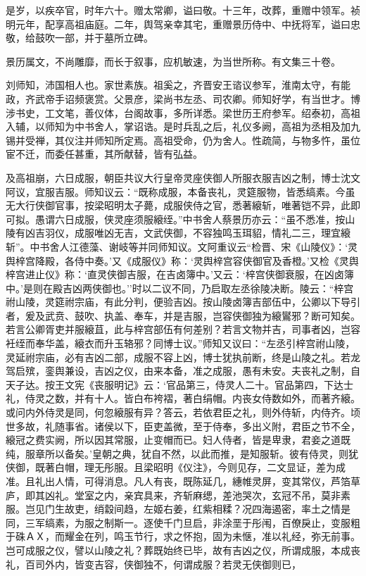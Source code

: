 \documentclass[]{article}
\begin{document}
是岁，以疾卒官，时年六十。赠太常卿，谥曰敬。十三年，改葬，重赠中领军。祯明元年，配享高祖庙庭。二年，舆驾亲幸其宅，重赠景历侍中、中抚将军，谥曰忠敬，给鼓吹一部，并于墓所立碑。

景历属文，不尚雕靡，而长于叙事，应机敏速，为当世所称。有文集三十卷。

刘师知，沛国相人也。家世素族。祖奚之，齐晋安王谘议参军，淮南太守，有能政，齐武帝手诏频褒赏。父景彦，梁尚书左丞、司农卿。师知好学，有当世才。博涉书史，工文笔，善仪体，台阁故事，多所详悉。梁世历王府参军。绍泰初，高祖入辅，以师知为中书舍人，掌诏诰。是时兵乱之后，礼仪多阙，高祖为丞相及加九锡并受禅，其仪注并师知所定焉。高祖受命，仍为舍人。性疏简，与物多忤，虽位宦不迁，而委任甚重，其所献替，皆有弘益。

及高祖崩，六日成服，朝臣共议大行皇帝灵座侠御人所服衣服吉凶之制，博士沈文阿议，宜服吉服。师知议云：``既称成服，本备丧礼，灵筵服物，皆悉缟素。今虽无大行侠御官事，按梁昭明太子薨，成服侠侍之官，悉著縗斩，唯著铠不异，此即可拟。愚谓六日成服，侠灵座须服縗绖。''中书舍人蔡景历亦云：``虽不悉准，按山陵有凶吉羽仪，成服唯凶无吉，文武侠御，不容独鸣玉珥貂，情礼二三，理宜縗斩''。中书舍人江德藻、谢岐等并同师知议。文阿重议云``检晋、宋《山陵仪》：`灵舆梓宫降殿，各侍中奏。'又《成服仪》称：`灵舆梓宫容侠御官及香橙。'又检《灵舆梓宫进止仪》称：`直灵侠御吉服，在吉卤簿中。'又云：`梓宫侠御衰服，在凶卤簿中。'是则在殿吉凶两侠御也。''时以二议不同，乃启取左丞徐陵决断。陵云：``梓宫祔山陵，灵筵祔宗庙，有此分判，便验吉凶。按山陵卤簿吉部伍中，公卿以下导引者，爰及武贲、鼓吹、执盖、奉车，并是吉服，岂容侠御独为縗鸑邪？断可知矣。若言公卿胥吏并服縗苴，此与梓宫部伍有何差别？若言文物并吉，司事者凶，岂容衽绖而奉华盖，縗衣而升玉辂邪？同博士议。''师知又议曰：``左丞引梓宫祔山陵，灵延祔宗庙，必有吉凶二部，成服不容上凶，博士犹执前断，终是山陵之礼。若龙驾启殡，銮舆兼设，吉凶之仪，由来本备，准之成服，愚有未安。夫丧礼之制，自天子达。按王文宪《丧服明记》云：`官品第三，侍灵人二十。官品第四，下达士礼，侍灵之数，并有十人。皆白布袴褶，著白绢帽。内丧女侍数如外，而著齐縗。或问内外侍灵是同，何忽縗服有异？答云，若依君臣之礼，则外侍斩，内侍齐。顷世多故，礼随事省。诸侯以下，臣吏盖微，至于侍奉，多出义附，君臣之节不全，縗冠之费实阙，所以因其常服，止变帽而已。妇人侍者，皆是卑隶，君妾之道既纯，服章所以备矣。'皇朝之典，犹自不然，以此而推，是知服斩。彼有侍灵，则犹侠御，既著白帽，理无彤服。且梁昭明《仪注》，今则见存，二文显证，差为成准。且礼出人情，可得消息。凡人有丧，既陈延几，繐帷灵屏，变其常仪，芦箔草庐，即其凶礼。堂室之内，亲宾具来，齐斩麻缌，差池哭次，玄冠不吊，莫非素服。岂见门生故吏，绡縠间趋，左姬右姜，红紫相糅？况四海遏密，率土之情是同，三军缟素，为服之制斯一。逐使千门旦启，非涂垩于彤闱，百僚戾止，变服粗于硃ＡＸ，而耀金在列，鸣玉节行，求之怀抱，固为未惬，准以礼经，弥无前事。岂可成服之仪，譬以山陵之礼？葬既始终已毕，故有吉凶之仪，所谓成服，本成丧礼，百司外内，皆变吉容，侠御独不，何谓成服？若灵无侠御则已，
\end{document}
